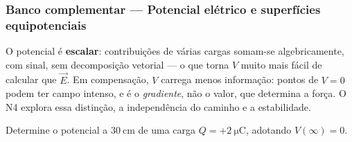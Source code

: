 
\subsubsection*{Banco complementar --- Potencial elétrico e superfícies equipotenciais}

\begin{atencao}
O potencial é \textbf{escalar}: contribuições de várias cargas somam-se
algebricamente, com sinal, sem decomposição vetorial --- o que torna $V$ muito
mais fácil de calcular que $\vec E$. Em compensação, $V$ carrega menos
informação: pontos de $V=0$ podem ter campo intenso, e é o \emph{gradiente},
não o valor, que determina a força. O N4 explora essa distinção, a
independência do caminho e a estabilidade.
\end{atencao}

\blocofixacao

\begin{questao}[1]{}
Determine o potencial a $\SI{30}{\centi\meter}$ de uma carga
$Q=+\SI{2}{\micro\coulomb}$, adotando $V(\infty)=0$.
\end{questao}

